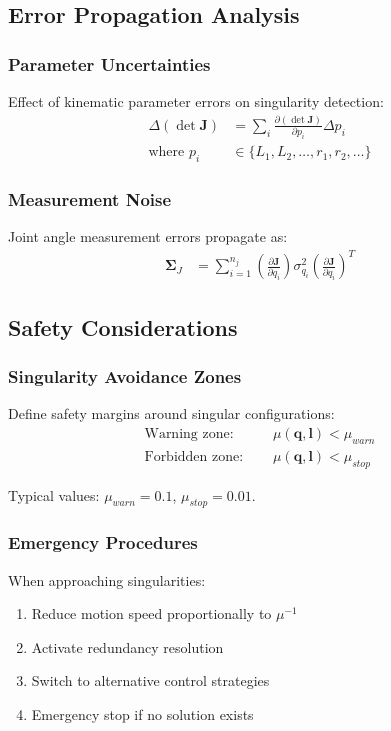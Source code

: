 \documentclass[11pt,a4paper]{article}
\begin{document}
\subsection{Error Propagation Analysis}

\subsubsection{Parameter Uncertainties}
Effect of kinematic parameter errors on singularity detection:
\begin{align}
\Delta(\det \bm{J}) &= \sum_{i} \frac{\partial(\det \bm{J})}{\partial p_i} \Delta p_i \\
\text{where } p_i &\in \{L_1, L_2, \ldots, r_1, r_2, \ldots\}
\end{align}

\subsubsection{Measurement Noise}
Joint angle measurement errors propagate as:
\begin{align}
\bm{\Sigma}_J &= \sum_{i=1}^{n_j} \left(\frac{\partial \bm{J}}{\partial q_i}\right) \sigma_{q_i}^2 \left(\frac{\partial \bm{J}}{\partial q_i}\right)^T
\end{align}

\subsection{Safety Considerations}

\subsubsection{Singularity Avoidance Zones}
Define safety margins around singular configurations:
\begin{align}
\text{Warning zone: } &\quad \mu(\bm{q}, \bm{l}) < \mu_{warn} \\
\text{Forbidden zone: } &\quad \mu(\bm{q}, \bm{l}) < \mu_{stop}
\end{align}

Typical values: $\mu_{warn} = 0.1$, $\mu_{stop} = 0.01$.

\subsubsection{Emergency Procedures}
When approaching singularities:
\begin{enumerate}
    \item Reduce motion speed proportionally to $\mu^{-1}$
    \item Activate redundancy resolution
    \item Switch to alternative control strategies
    \item Emergency stop if no solution exists
\end{enumerate}
\end{document}
